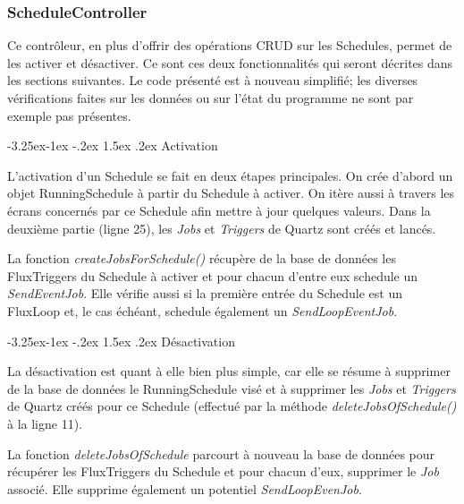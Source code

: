 \documentclass[french]{article}
\makeatletter
\renewcommand\paragraph{\@startsection{paragraph}{4}{\z@}%
                                     {-3.25ex\@plus -1ex \@minus -.2ex}%
                                     {1.5ex \@plus .2ex}%
                                     {\normalfont\normalsize\bfseries}}
\makeatother
\begin{document}
\subsubsection{ScheduleController}

Ce contrôleur, en plus d'offrir des opérations CRUD sur les Schedules, permet de les activer et désactiver. Ce sont ces deux fonctionnalités qui seront décrites dans les sections suivantes. Le code présenté est à nouveau simplifié; les diverses vérifications faites sur les données ou sur l'état du programme ne sont par exemple pas présentes.

\paragraph{Activation}

L'activation d'un Schedule se fait en deux étapes principales. On crée d'abord un objet RunningSchedule à partir du Schedule à activer. On itère aussi à travers les écrans concernés par ce Schedule afin mettre à jour quelques valeurs. Dans la deuxième partie (ligne 25), les \textit{Jobs} et \textit{Triggers} de Quartz sont créés et lancés.



La fonction \textit{createJobsForSchedule()} récupère de la base de données les FluxTriggers du Schedule à activer et pour chacun d'entre eux schedule un \textit{SendEventJob}. Elle vérifie aussi si la première entrée du Schedule est un FluxLoop et, le cas échéant, schedule également un \textit{SendLoopEventJob}.


\paragraph{Désactivation}

La désactivation est quant à elle bien plus simple, car elle se résume à supprimer de la base de données le RunningSchedule visé et à supprimer les \textit{Jobs} et \textit{Triggers} de Quartz créés pour ce Schedule (effectué par la méthode \textit{deleteJobsOfSchedule()} à la ligne 11).



La fonction \textit{deleteJobsOfSchedule} parcourt à nouveau la base de données pour récupérer les FluxTriggers du Schedule et pour chacun d'eux, supprimer le \textit{Job} associé. Elle supprime également un potentiel \textit{SendLoopEvenJob}. 
\end{document}

